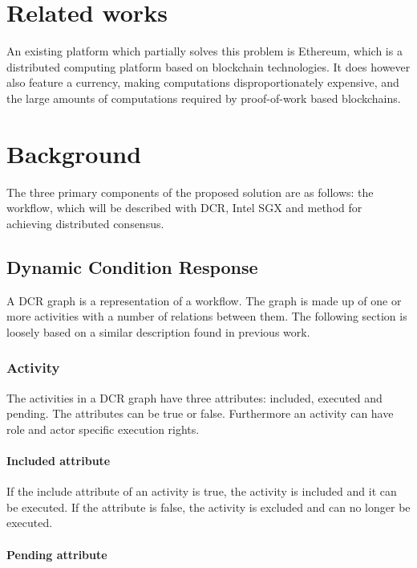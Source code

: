 \documentclass[12pt]{article}
\begin{document}
	\section{Related works}

	An existing platform which partially solves this problem is Ethereum\cite{ethereum-white-paper}, which is a distributed computing platform based on blockchain technologies.
	It does however also feature a currency, making computations disproportionately expensive, and the large amounts of computations required by proof-of-work based blockchains.

	\section{Background}

	The three primary components of the proposed solution are as follows: the workflow, which will be described with DCR, Intel SGX and method for achieving distributed consensus.

		\subsection{Dynamic Condition Response}

		A DCR graph is a representation of a workflow.
		The graph is made up of one or more activities with a number of relations between them. 
		The following section is loosely based on a similar description found in previous work\cite{dcreum}.

		\subsubsection{Activity}

		The activities in a DCR graph have three attributes: included, executed and pending. 
		The attributes can be true or false. 
		Furthermore an activity can have role and actor specific execution rights.

			\paragraph{Included attribute}

			If the include attribute of an activity is true, the activity is included and it can be executed. 
			If the attribute is false, the activity is excluded and can no longer be executed.

			\paragraph{Pending attribute}
\end{document}
